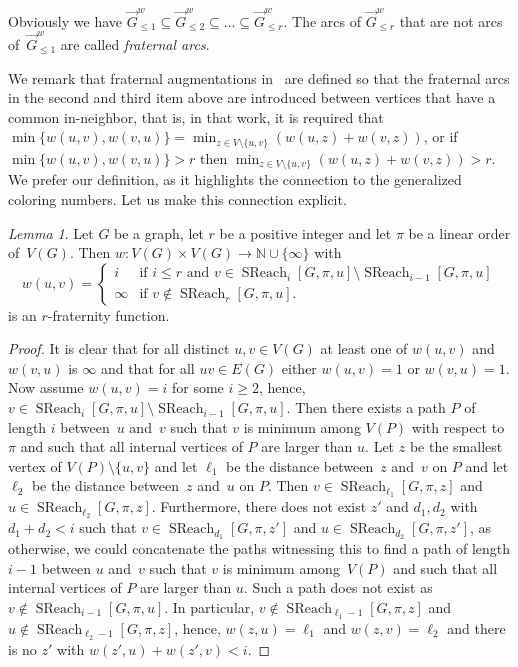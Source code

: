 \documentclass[1p,number,a4paper]{elsarticle}
\theoremstyle{remark}
\newcommand{\N}{\mathbb{N}}
\DeclareMathOperator{\SReach}{SReach}
\newtheorem{lemma}[theorem]{Lemma}
\begin{document}
Obviously we have $\vec{G}^w_{\leq 1}\subseteq \vec{G}^w_{\leq 2}\subseteq \ldots\subseteq \vec{G}^w_{\leq r}$. The arcs 
of $\vec{G}^w_{\leq r}$ that are not arcs of~$\vec{G}^w_{\leq 1}$
are called \emph{fraternal arcs}. 

We remark that fraternal augmentations 
in~\cite{nevsetril2012sparsity}  
are defined so that the fraternal arcs in the 
second and third item above are introduced between vertices 
that have a common 
in-neighbor, that is, in that work, it is required that 
$\min \{w(u,v), w(v,u)\}=
\min_{z\in V\setminus\{u,v\}} (w(u,z)+w(v,z))$, 
or if $\min \{w(u,v), w(v,u)\}>r$ then
$\min_{z\in V\setminus\{u,v\}} (w(u,z)+w(v,z))>r$.  
We prefer our definition, as it highlights the connection
to the generalized coloring numbers. Let us make this connection 
explicit. 

\begin{lemma}\label{lem:col-frat}
Let $G$ be a graph, let $r$ be a positive integer and let 
$\pi$ be a linear order of~$V(G)$. Then $w\colon V(G)\times
V(G)\rightarrow \N\cup \{\infty\}$ with 
\[w(u,v)=\begin{cases}
i & \text{if $i\leq r$ and $v\in \SReach_i[G,\pi,u]\setminus 
\SReach_{i-1}[G,\pi,u]$}\\
\infty & \text{if $v\not\in \SReach_r[G,\pi,u]$}. 
\end{cases} 
\]
is an $r$-fraternity function. 
\end{lemma}
\begin{proof}
It is clear that for all distinct $u,v\in V(G)$
at least one of $w(u,v)$ and $w(v,u)$ is $\infty$ and
that for all $uv\in E(G)$ either $w(u,v)=1$ or $w(v,u)=1$.
Now assume $w(u,v)=i$ for some $i\geq 2$, hence, 
$v\in \SReach_i[G,\pi,u]\setminus 
\SReach_{i-1}[G,\pi,u]$. Then there exists a path $P$ of 
length $i$ between~$u$ and~$v$ such that $v$ is 
minimum among $V(P)$ with respect to $\pi$ and such 
that all internal vertices of $P$ are larger than $u$. 
Let $z$ be the smallest vertex of $V(P)\setminus\{u,v\}$ and let 
$\ell_1$ be the distance between~$z$ and~$v$ on $P$ and let $\ell_2$ be the distance between~$z$ and~$u$ on $P$. Then $v\in \SReach_{\ell_1}[G,\pi,z]$ 
and $u\in \SReach_{\ell_2}[G,\pi,z]$. Furthermore, there 
does not exist $z'$ and $d_1,d_2$ with $d_1+d_2<i$
such that $v\in \SReach_{d_1}[G,\pi,z']$ 
and $u\in \SReach_{d_2}[G,\pi,z']$, as otherwise, 
we could concatenate the paths witnessing this to find a 
path of length $i-1$ between $u$ and~$v$ such that $v$ is 
minimum among~$V(P)$ and such 
that all internal vertices of $P$ are larger than $u$. Such a 
path does not exist as $v\not\in\SReach_{i-1}[G,\pi,u]$. 
In particular, $v\not\in \SReach_{\ell_1-1}[G,\pi,z]$ 
and $u\not\in \SReach_{\ell_2-1}[G,\pi,z]$, hence, 
$w(z,u)=\ell_1$ and $w(z,v)=\ell_2$ and there is no
$z'$ with $w(z',u)+w(z',v)<i$. 
\end{proof}
\end{document}
